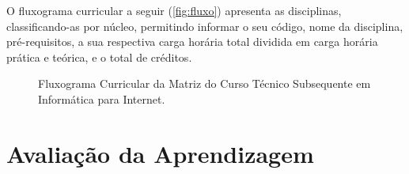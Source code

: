 \documentclass[
	12pt,				%
	openright,			%
	twoside,			%
	a4paper,			%
	chapter=TITLE,		%
	english,			%
	french,				%
	spanish,			%
	brazil,				%
	]{abntex2}
\begin{document}
\begin{landscape}
\begin{quadro}[h]
{\begin{tabularx}{1.6\textwidth}{c c X c c c c l}
\end{tabularx}

}{
}
\end{quadro}

\clearpage
\newpage



\end{landscape}


O fluxograma curricular a seguir (\autoref{fig:fluxo}) apresenta as disciplinas, classificando-as por núcleo, permitindo informar o seu código, nome da disciplina, pré-requisitos, a sua respectiva carga horária total dividida em carga horária prática e teórica, e o total de créditos. %

\begin{figure}[htpb]
   \caption{Fluxograma Curricular da Matriz do Curso Técnico Subsequente em Informática para Internet.}
    \label{fig:fluxo}
\end{figure}

\color{black}

\section{Avaliação da Aprendizagem}
\end{document}
